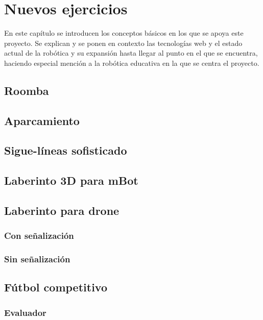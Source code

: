\chapter{Nuevos ejercicios}
\label{chap:nuevos_ejercicios} 
En este capítulo se introducen los conceptos básicos en los que se apoya este proyecto. Se explican y se ponen en contexto las tecnologías web y el estado actual de la robótica y su expansión hasta llegar al punto en el que se encuentra, haciendo especial mención a la robótica educativa en la que se centra el proyecto.
   
\section{Roomba}
\section{Aparcamiento}
\section{Sigue-líneas sofisticado}
\section{ Laberinto 3D para mBot}
\section{Laberinto para drone}
\subsection{Con señalización}
\subsection{Sin señalización}
\section{Fútbol competitivo}
\subsection{Evaluador}


